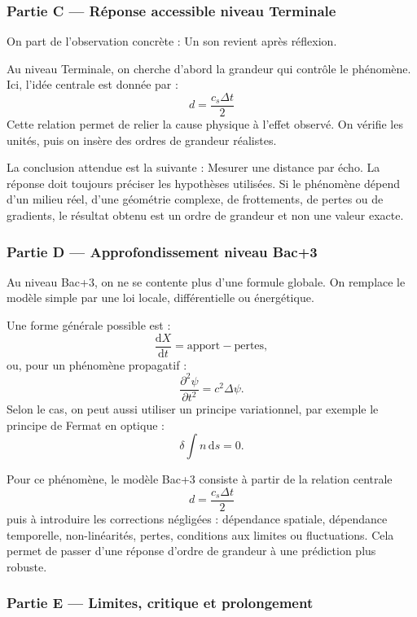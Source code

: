 \documentclass[11pt,a4paper]{article}
\begin{document}
\subsubsection*{Partie C — Réponse accessible niveau Terminale}

\begin{corrigebox}
On part de l'observation concrète : Un son revient après réflexion.

Au niveau Terminale, on cherche d'abord la grandeur qui contrôle le phénomène. Ici, l'idée centrale est donnée par :
\[
d=\frac{c_s\Delta t}{2}
\]
Cette relation permet de relier la cause physique à l'effet observé. On vérifie les unités, puis on insère des ordres de grandeur réalistes.

La conclusion attendue est la suivante : Mesurer une distance par écho. La réponse doit toujours préciser les hypothèses utilisées. Si le phénomène dépend d'un milieu réel, d'une géométrie complexe, de frottements, de pertes ou de gradients, le résultat obtenu est un ordre de grandeur et non une valeur exacte.
\end{corrigebox}

\subsubsection*{Partie D — Approfondissement niveau Bac+3}

\begin{approfondissementbox}
Au niveau Bac+3, on ne se contente plus d'une formule globale. On remplace le modèle simple par une loi locale, différentielle ou énergétique.

Une forme générale possible est :
\[
\frac{\mathrm d X}{\mathrm dt}=\text{apport}-\text{pertes},
\]
ou, pour un phénomène propagatif :
\[
\frac{\partial^2 \psi}{\partial t^2}=c^2\Delta\psi.
\]
Selon le cas, on peut aussi utiliser un principe variationnel, par exemple le principe de Fermat en optique :
\[
\delta \int n\,\mathrm ds=0.
\]

Pour ce phénomène, le modèle Bac+3 consiste à partir de la relation centrale
\[
d=\frac{c_s\Delta t}{2}
\]
puis à introduire les corrections négligées : dépendance spatiale, dépendance temporelle, non-linéarités, pertes, conditions aux limites ou fluctuations. Cela permet de passer d'une réponse d'ordre de grandeur à une prédiction plus robuste.
\end{approfondissementbox}

\subsubsection*{Partie E — Limites, critique et prolongement}
\end{document}
